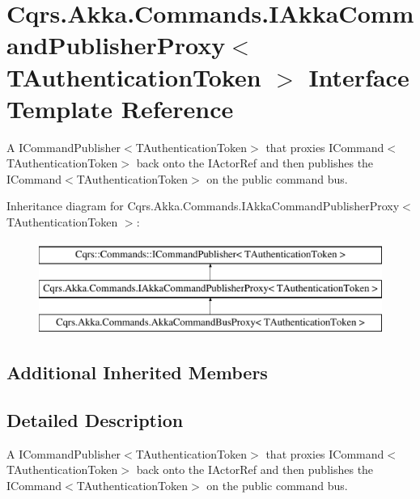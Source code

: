 \hypertarget{interfaceCqrs_1_1Akka_1_1Commands_1_1IAkkaCommandPublisherProxy}{}\section{Cqrs.\+Akka.\+Commands.\+I\+Akka\+Command\+Publisher\+Proxy$<$ T\+Authentication\+Token $>$ Interface Template Reference}
\label{interfaceCqrs_1_1Akka_1_1Commands_1_1IAkkaCommandPublisherProxy}


A I\+Command\+Publisher$<$\+T\+Authentication\+Token$>$ that proxies I\+Command$<$\+T\+Authentication\+Token$>$ back onto the I\+Actor\+Ref and then publishes the I\+Command$<$\+T\+Authentication\+Token$>$ on the public command bus.  


Inheritance diagram for Cqrs.\+Akka.\+Commands.\+I\+Akka\+Command\+Publisher\+Proxy$<$ T\+Authentication\+Token $>$\+:\begin{figure}[H]
\begin{center}
\leavevmode
\includegraphics[height=3.000000cm]{interfaceCqrs_1_1Akka_1_1Commands_1_1IAkkaCommandPublisherProxy}
\end{center}
\end{figure}
\subsection*{Additional Inherited Members}


\subsection{Detailed Description}
A I\+Command\+Publisher$<$\+T\+Authentication\+Token$>$ that proxies I\+Command$<$\+T\+Authentication\+Token$>$ back onto the I\+Actor\+Ref and then publishes the I\+Command$<$\+T\+Authentication\+Token$>$ on the public command bus. 

